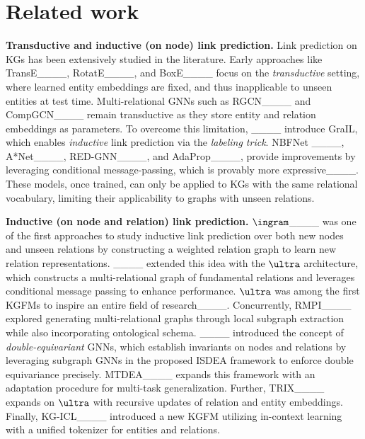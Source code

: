 \section{Related work}
\textbf{Transductive and inductive (on node) link prediction.} Link prediction on KGs has been extensively studied in the literature. Early approaches like TransE____, RotatE____, and BoxE____ focus on the \emph{transductive} setting, 
where learned entity 
embeddings are fixed, and thus 
inapplicable to unseen 
entities at test time. 
Multi-relational GNNs such as RGCN____ and CompGCN____ remain transductive as they store entity and relation embeddings as parameters. To overcome this limitation, ____ introduce GraIL, which enables 
\emph{inductive} link prediction via the {\em labeling trick}. 
NBFNet ____, %
A*Net____, RED-GNN____, and AdaProp____, 
provide improvements 
by leveraging conditional message-passing, which is provably more expressive____.
These models, once trained, can only be applied to KGs with the same relational vocabulary, limiting their applicability
to graphs with unseen relations. %

\textbf{Inductive (on node and relation) link prediction.}
$\ingram$____ was one of the first approaches to study inductive link prediction over both new nodes and unseen relations by constructing a weighted relation graph to learn new relation representations. ____ extended this idea with the $\ultra$ architecture, which constructs a multi-relational graph of fundamental relations and leverages conditional message passing to enhance performance. $\ultra$ was among the first KGFMs to inspire an entire field of research____. Concurrently, RMPI____ explored generating multi-relational graphs through local subgraph extraction while also incorporating ontological schema. 
%
____ introduced the concept of \emph{double-equivariant} GNNs, which establish invariants on nodes and relations by leveraging subgraph GNNs in the proposed ISDEA framework to enforce double equivariance precisely. MTDEA____ 
expands this framework %
with an adaptation procedure for multi-task generalization.
%
Further, TRIX____  expands on $\ultra$ with recursive updates of relation and entity embeddings. 
Finally, KG-ICL____ introduced a new KGFM utilizing in-context learning with a unified tokenizer for entities and relations. 
%

